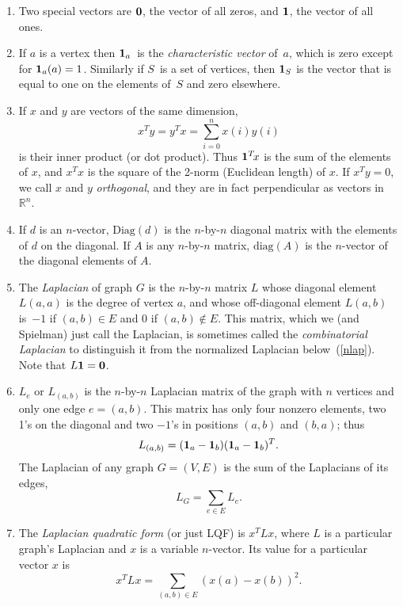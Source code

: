 \documentclass[11pt]{article}
\newcommand{\m}[1]{{\bf{#1}}}       %
\newcommand{\ones}{\m1}             %
\newcommand{\zeros}{\m0}            %
\newcommand{\diag}{\mbox{diag}}
\newcommand{\Diag}{\mbox{Diag}}
\newcommand{\Real}{\mathbb{R}}      %
\begin{document}
\begin{enumerate}
\item
Two special vectors are $\zeros$, the vector of all zeros,
and $\ones$, the vector of all ones.

\item
If $a$ is a vertex then $\ones_a$~is the 
{\em characteristic vector} of~$a$, which
is zero except for $\ones_a(a)=1$.
Similarly if $S$~is a set of vertices, 
then $\ones_S$ is the vector that is equal to one
on the elements of~$S$ and zero elsewhere.

\item
If $x$ and $y$ are vectors of the same dimension, 
$$x^Ty = y^Tx = \sum_{i=0}^{n}x(i)y(i)$$
is their inner product (or dot product).
Thus $\ones^T\!x$ is the sum of the elements of $x$,
and $x^Tx$ is the square of the 2-norm (Euclidean length) of $x$.
If $x^Ty=0$, we call $x$ and $y$ {\em orthogonal}, 
and they are in fact perpendicular as vectors in $\Real^n$.

\item
If $d$ is an $n$-vector, $\Diag(d)$ is the $n$-by-$n$ diagonal 
matrix with the elements of $d$ on the diagonal.
If $A$ is any $n$-by-$n$ matrix, $\diag(A)$ is the $n$-vector
of the diagonal elements of $A$.

\item\label{lap}
The {\em Laplacian} of graph $G$ is the $n$-by-$n$ matrix $L$
whose diagonal element $L(a,a)$ is the degree of vertex $a$, 
and whose off-diagonal element $L(a,b)$ is~$-1$ if $(a,b) \in E$ 
and $0$ if $(a,b) \notin E$.
This matrix, which we (and Spielman) just call the Laplacian,
is sometimes called the {\em combinatorial Laplacian} to 
distinguish it from the normalized Laplacian below~(\ref{nlap}).
Note that $ L\ones = \zeros$.

\item
$L_e$ or $L_{(a,b)}$ is the $n$-by-$n$ Laplacian matrix
of the graph with $n$ vertices and only one edge $e = (a,b)$.
This matrix has only four nonzero elements, two 1's on the
diagonal and two $-1$'s in positions $(a,b)$ and $(b,a)$;
thus 
$$L_{(a,b)}=(\ones_a-\ones_b)(\ones_a-\ones_b)^T.$$
The Laplacian of any graph $G=(V,E)$ is the sum of the Laplacians
of its edges,
$$L_G = \sum_{e\in E} L_e.$$

\item\label{LQF}
The {\em Laplacian quadratic form} (or just LQF) is $x^TLx$,
where $L$ is a particular graph's Laplacian and $x$ is a variable $n$-vector.
Its value for a particular vector $x$ is 
$$x^TLx = \sum_{(a,b)\in E}(x(a)-x(b))^2.$$


\end{enumerate}
\end{document}
